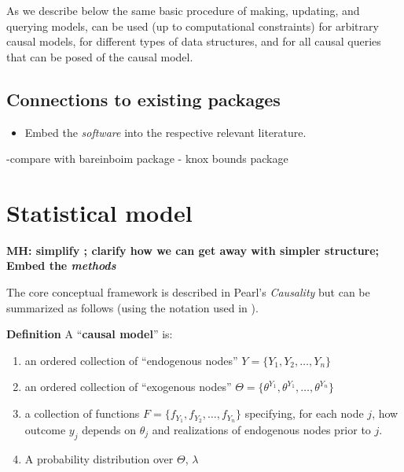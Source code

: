 \documentclass[
  article]{jss}
\providecommand{\tightlist}{%
  \setlength{\itemsep}{0pt}\setlength{\parskip}{0pt}}\usepackage{longtable,booktabs,array}
\begin{document}
As we describe below the same basic procedure of making, updating, and
querying models, can be used (up to computational constraints) for
arbitrary causal models, for different types of data structures, and for
all causal queries that can be posed of the causal model.

\hypertarget{connections-to-existing-packages}{%
\subsection{Connections to existing
packages}\label{connections-to-existing-packages}}

\begin{itemize}
\tightlist
\item
  Embed the \emph{software} into the respective relevant literature.
\end{itemize}

-compare with bareinboim package - knox bounds package

\hypertarget{statistical-model}{%
\section{Statistical model}\label{statistical-model}}

\textbf{MH: simplify ; clarify how we can get away with simpler
structure; Embed the \emph{methods}}

The core conceptual framework is described in Pearl's \emph{Causality}
\citep{pearl2009causality} but can be summarized as follows (using the
notation used in \citet{ii2023}).

\textbf{Definition} A ``\textbf{causal model}'' is:

\begin{enumerate}
\def\labelenumi{\arabic{enumi}.}
\tightlist
\item
  an ordered collection of ``endogenous nodes''
  \(Y = \{Y_1, Y_2, \dots, Y_n\}\)
\item
  an ordered collection of ``exogenous nodes''
  \(\Theta = \{\theta^{Y_1}, \theta^{Y_1}, \dots, \theta^{Y_n}\}\)
\item
  a collection of functions \(F = \{f_{Y_1}, f_{Y_2}, \dots, f_{Y_n}\}\)
  specifying, for each node \(j\), how outcome \(y_j\) depends on
  \(\theta_j\) and realizations of endogenous nodes prior to \(j\).
\item
  A probability distribution over \(\Theta\), \(\lambda\)
\end{enumerate}
\end{document}
